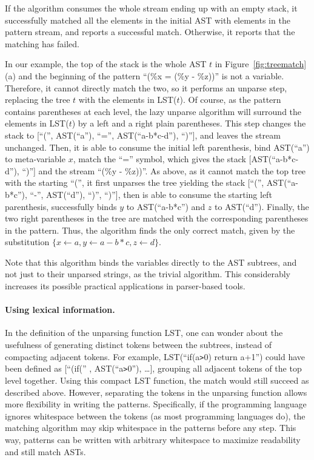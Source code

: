 \documentclass{sigplanconf}
\begin{document}
If the algorithm consumes the whole stream ending up with an empty
stack, it successfully matched all the elements in the initial AST
with elements in the pattern stream, and reports a successful
match. Otherwise, it reports that the matching has failed.

In our example, the top of the stack is the whole AST $t$ in
Figure~\ref{fig:treematch}(a) and the beginning of the pattern ``(\%x
= (\%y - \%z))'' is not a variable. Therefore, it cannot directly
match the two, so it performs an unparse step, replacing the tree $t$
with the elements in LST($t$). Of course, as the pattern contains
parentheses at each level, the lazy unparse algorithm will surround
the elements in LST($t$) by a left and a right plain parentheses.
This step changes the stack to [``('', AST(``a''), ``='',
AST(``a-b*c-d''), ``)''], and leaves the stream unchanged. Then, it is
able to consume the initial left parenthesis, bind AST(``a'') to
meta-variable $x$, match the ``='' symbol, which gives the stack
[AST(``a-b*c-d''), ``)''] and the stream ``(\%y - \%z))''. As above,
as it cannot match the top tree with the starting ``('', it first
unparses the tree yielding the stack [``('', AST(``a-b*c''), ``-'',
AST(``d''), ``)'', ``)''], then is able to consume the starting left
parenthesis, successfully binds $y$ to AST(``a-b*c'') and $z$ to
AST(``d''). Finally, the two right parentheses in the tree are matched
with the corresponding parentheses in the pattern. Thus, the algorithm
finds the only correct match, given by the substitution $\{x\gets a,
y\gets a-b*c, z\gets d\}$.

Note that this algorithm binds the variables directly to the AST
subtrees, and not just to their unparsed strings, as the trivial
algorithm. This considerably increases its possible practical
applications in parser-based tools.

\paragraph{Using lexical information.}
In the definition of the unparsing function LST, one can wonder about
the usefulness of generating distinct tokens between the subtrees,
instead of compacting adjacent tokens. For example,
LST(``if(a\verb.>.0) return a+1'') could have been defined as
[``(if('' , AST(``a\verb.>.0''), \dots], grouping all adjacent tokens
of the top level together. Using this compact LST function, the match
would still succeed as described above. However, separating the tokens
in the unparsing function allows more flexibility in writing the
patterns. Specifically, if the programming language ignores whitespace
between the tokens (as most programming languages do), the matching
algorithm may skip whitespace in the patterns before any step. This
way, patterns can be written with arbitrary whitespace to maximize
readability and still match ASTs.
\end{document}
